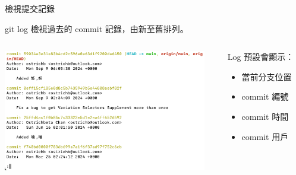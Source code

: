 \documentclass[xetex, unicode, 10pt, aspectratio=169]{beamer}
\begin{document}
\begin{frame}{檢視提交記錄}
    \begin{block}{git log}
        檢視過去的 commit 記錄，由新至舊排列。
        \begin{columns}
            \begin{column}{0.6\textwidth}
                \begin{center}
                    \includegraphics[width=3.5in]{./img/git-log.png}
                \end{center}
            \end{column}
            \begin{column}{0.4\textwidth}
                Log 預設會顯示：
                \begin{itemize}
                    \item 當前分支位置
                    \item commit 編號
                    \item commit 時間
                    \item commit 用戶
                \end{itemize}
            \end{column}
        \end{columns}
    \end{block}
\end{frame}
\end{document}
